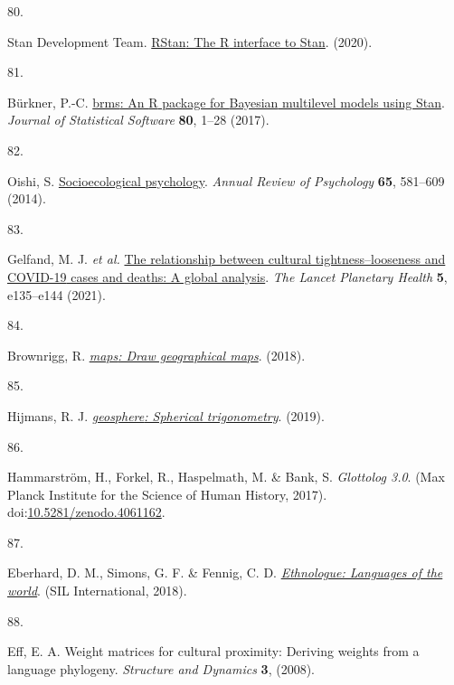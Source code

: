 \documentclass[
  man,floatsintext]{apa6}
\newlength{\cslhangindent}
\newlength{\csllabelwidth}
\newlength{\cslentryspacingunit} %
\newenvironment{CSLReferences}[2] %
 {%
  \setlength{\parindent}{0pt}
  \ifodd #1
  \let\oldpar\par
  \def\par{\hangindent=\cslhangindent\oldpar}
  \fi
  \setlength{\parskip}{#2\cslentryspacingunit}
 }%
 {}
\newcommand{\CSLLeftMargin}[1]{\parbox[t]{\csllabelwidth}{#1}}
\newcommand{\CSLRightInline}[1]{\parbox[t]{\linewidth - \csllabelwidth}{#1}\break}
\begin{document}
\begin{CSLReferences}{0}{0}
\leavevmode{}%
\CSLLeftMargin{80. }%
\CSLRightInline{Stan Development Team. \href{http://mc-stan.org/}{{RStan}: The {R} interface to {Stan}}. (2020).}

\leavevmode{}%
\CSLLeftMargin{81. }%
\CSLRightInline{Bürkner, P.-C. \href{https://doi.org/10.18637/jss.v080.i01}{{brms}: An {R} package for {Bayesian} multilevel models using {Stan}}. \emph{Journal of Statistical Software} \textbf{80}, 1--28 (2017).}

\leavevmode{}%
\CSLLeftMargin{82. }%
\CSLRightInline{Oishi, S. \href{https://doi.org/10.1146/annurev-psych-030413-152156}{Socioecological psychology}. \emph{Annual Review of Psychology} \textbf{65}, 581--609 (2014).}

\leavevmode{}%
\CSLLeftMargin{83. }%
\CSLRightInline{Gelfand, M. J. \emph{et al.} \href{https://doi.org/10.1016/S2542-5196(20)30301-6}{The relationship between cultural tightness--looseness and {COVID-19} cases and deaths: A global analysis}. \emph{The Lancet Planetary Health} \textbf{5}, e135--e144 (2021).}

\leavevmode{}%
\CSLLeftMargin{84. }%
\CSLRightInline{Brownrigg, R. \emph{\href{https://CRAN.R-project.org/package=maps}{{maps}: Draw geographical maps}}. (2018).}

\leavevmode{}%
\CSLLeftMargin{85. }%
\CSLRightInline{Hijmans, R. J. \emph{\href{https://CRAN.R-project.org/package=geosphere}{{geosphere}: Spherical trigonometry}}. (2019).}

\leavevmode{}%
\CSLLeftMargin{86. }%
\CSLRightInline{Hammarström, H., Forkel, R., Haspelmath, M. \& Bank, S. \emph{Glottolog 3.0}. (Max Planck Institute for the Science of Human History, 2017). doi:\href{https://doi.org/10.5281/zenodo.4061162}{10.5281/zenodo.4061162}.}

\leavevmode{}%
\CSLLeftMargin{87. }%
\CSLRightInline{Eberhard, D. M., Simons, G. F. \& Fennig, C. D. \emph{\href{https://www.ethnologue.com/}{Ethnologue: Languages of the world}}. (SIL International, 2018).}

\leavevmode{}%
\CSLLeftMargin{88. }%
\CSLRightInline{Eff, E. A. Weight matrices for cultural proximity: Deriving weights from a language phylogeny. \emph{Structure and Dynamics} \textbf{3}, (2008).}


\end{CSLReferences}
\end{document}
